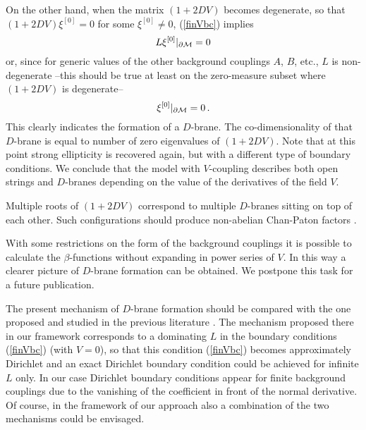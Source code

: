 \documentclass[a4paper,12pt]{article}
\newcommand{\oB}{|_{\partial{\cal M}}}
\begin{document}
On the other hand,
when the matrix $(1+2DV )$ becomes degenerate, so that
$(1+2DV )\xi^{[0]}=0$ for some 
$\xi^{[0]}\ne 0$,  (\ref{finVbc}) implies
\begin{equation}
L\xi^{[0]}\oB =0 \label{Dir21}
\end{equation}
or, since for generic values of the other background couplings
$A$, $B$, etc., 
$L$ is non-degenerate --this should be true at least
on the zero-measure subset where $(1+2DV )$ is degenerate--
\begin{equation}
\xi^{[0]}\oB =0 \label{Dir31}\,.
\end{equation}
This clearly indicates the formation of a $D$-brane.
The co-dimensionality of that $D$-brane is equal to number
of zero eigenvalues of $(1+2DV)$. Note  that
at this point strong ellipticity is recovered again,
but with a different type of boundary conditions.
We conclude that the model with $V$-coupling
describes both open strings and $D$-branes depending
on the value of the derivatives of the field $V$.

Multiple roots of $(1+2DV)$ correspond to multiple
$D$-branes sitting on top of each other. Such configurations
should produce non-abelian Chan-Paton factors 
\cite{Polchinski95}.

With some restrictions on the form of the background
couplings it is possible to calculate the $\beta$-functions
without expanding in power series of $V$. In this way
a clearer picture of  $D$-brane formation can be obtained.
We postpone this task for a future publication.

The present mechanism of $D$-brane formation should be compared
with the one proposed and studied in the previous literature
\cite{Sen99,Harvey00,HKM00,Majumder00,Mello00,Moeller00,Husain00}.
The mechanism proposed there  in our framework  corresponds
to a dominating $L$ in the boundary conditions
(\ref{finVbc}) (with $V=0$), so that this condition
(\ref{finVbc}) becomes approximately Dirichlet and an exact Dirichlet 
boundary condition could be achieved for infinite $L$
only. In our case Dirichlet boundary conditions appear
for finite background couplings due to the vanishing of the
coefficient in front of the normal derivative. Of course,
in the framework of our approach  also 
a combination of the two mechanisms could be envisaged.

\end{document}
